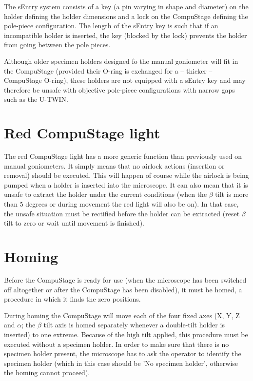 \documentclass[12pt]{article}
\begin{document}
The sEntry system consists of a key (a pin varying in shape and
diameter) on the holder defining the holder dimensions and a lock on
the CompuStage defining the pole-piece configuration. The length of
the sEntry key is such that if an incompatible holder is inserted,
the key (blocked by the lock) prevents the holder from going between
the pole pieces.

Although older specimen holders designed fo the manual goniometer will
fit in the CompuStage (provided their O-ring is exchanged for a
-- thicker -- CompuStage O-ring), these holders are not equipped with a
sEntry key and may therefore be unsafe with objective pole-piece
configurations with narrow gaps such as the U-TWIN.

\section{Red CompuStage light}

The red CompuStage light has a more generic function than previously
used on manual goniometers. It simply means that no airlock actions
(insertion or removal) should be executed. This will happen of
course while the airlock is being pumped when a holder is inserted into
the microscope. It can also mean
that it is unsafe to extract the holder under the current conditions
(when the $\beta$ tilt is more than 5 degrees
or during movement the red light will also be on). In that case, the
unsafe situation must be rectified before the holder can be extracted
(reset $\beta$ tilt to zero or wait until movement is finished).


\section{Homing}

Before the CompuStage is ready for use (when the microscope has been
switched off altogether or after the CompuStage has been disabled), it
must be homed, a procedure in which it finds the zero positions.

During homing the CompuStage will move each of the four fixed axes (X,
Y, Z and $\alpha$; the $\beta$ tilt axis is homed separately whenever
a double-tilt holder is inserted) to one extreme. Because of the high
tilt applied, this procedure must be executed without a specimen holder.
In order to make sure that there is no specimen holder present, the
microscope has to ask the operator to identify the specimen holder
(which in this case should be 'No specimen holder', otherwise the
homing cannot proceed).
\end{document}
